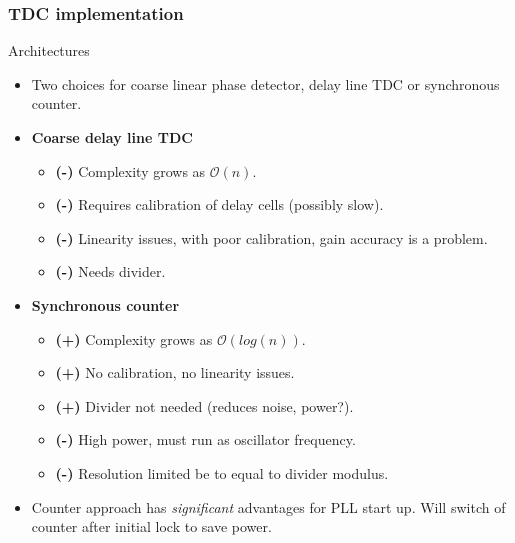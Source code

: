 \documentclass[t, screen, aspectratio=43]{beamer}
\begin{document}
\begin{frame}
	\frametitle{TDC implementation}
	\begin{block}{Architectures}
		\begin{itemize}[itemsep=4pt,label=\protect---]
			\scriptsize
			\item Two choices for coarse linear phase detector, delay line TDC or synchronous counter.

				\scriptsize
				\item \textbf{Coarse delay line TDC}
				\begin{itemize}
					\scriptsize
					\item {\color{red}\textbf{(-)}} Complexity grows as $\mathcal{O}(n)$.
					\item {\color{red}\textbf{(-)}} Requires calibration of delay cells (possibly slow).
					\item {\color{red}\textbf{(-)}} Linearity issues, with poor calibration, gain accuracy is a problem.
					\item {\color{red}\textbf{(-)}} Needs divider.
				\end{itemize}

				\item \textbf{Synchronous counter}
				\begin{itemize}
					\scriptsize
					\item {\color{teal}\textbf{(+)}} Complexity grows as $\mathcal{O}(log(n))$.
					\item {\color{teal}\textbf{(+)}} No calibration, no linearity issues.
					\item {\color{teal}\textbf{(+)}} Divider not needed (reduces noise, power?).
					\item {\color{red}\textbf{(-)}} High power, must run as oscillator frequency.
					\item {\color{red}\textbf{(-)}} Resolution limited be to equal to divider modulus.
				\end{itemize}
			\item Counter approach has \textit{significant} advantages for PLL start up. Will switch of counter after initial lock to save power.
		\end{itemize} 	
	\end{block}
\end{frame}
\end{document}
